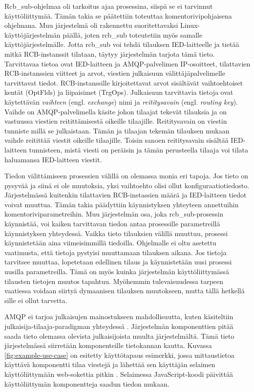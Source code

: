 Rcb\_sub-ohjelmaa oli tarkoitus ajaa prosessina, siispä se ei tarvinnut käyttöliittymää. Tämän takia se päätettiin toteuttaa komentorivipohjaisena ohjelmana. Muu järjestelmä oli rakennettu suoritettavaksi Linux-käyttöjärjestelmän päällä, joten rcb\_sub toteutetiin myös samalle käyttöjärjestelmälle. Jotta rcb\_sub voi tehdä tilauksen IED-laitteelle ja tietää mitkä RCB-instanssit tilataan, täytyy järjestelmän tarjota tämä tieto. Tarvittavaa tietoa ovat IED-laitteen ja AMQP-palvelimen IP-osoitteet, tilattavien RCB-instanssien viitteet ja arvot, viestien julkaisuun välittäjäpalvelimelle tarvittavat tiedot. RCB-instanssille kirjoitettavat arvot sisältävät vaihtoehtoiset kentät (OptFlds) ja liipaisimet (TrgOps). Julkaisuun tarvittavia tietoja ovat käytettävän \emph{vaihteen} (engl. \emph{exchange}) nimi ja \emph{reititysavain} (engl. \emph{routing key}). Vaihde on AMQP-palvelimella käsite johon tilaajat tekevät tilauksia ja on vastuussa viestien reitittämisestä oikeille tilaajille. Reititysavain on viestin tunniste millä se julkaistaan. Tämän ja tilaajan tekemän tilauksen mukaan vaihde reitittää viestit oikeille tilaajille. Toisin sanoen reititysavain sisältää IED-laitteen tunnisteen, mistä viesti on peräisin ja tämän perusteella tilaaja voi tilata haluamansa IED-laitteen viestit.

Tiedon välittämiseen prosessien välillä on olemassa monia eri tapoja. Jos tieto on pysyvää ja siinä ei ole muutoksia, yksi vaihtoehto olisi ollut konfiguraatiotiedosto. Järjestelmässä kuitenkin tilattavien RCB-instassien määrä ja IED-laitteen tiedot voivat muuttua. Tämän takia päädyttiin käynnistyksen yhteyteen annettuihin komentoriviparametreihin. Muu järjestelmän osa, joka rcb\_sub-prosessin käynnistää, voi kaiken tarvittavan tiedon antaa prosessille parametreillä käynnistyksen yhteydessä. Vaikka tieto tilauksien välillä muuttuu, prosessi käynnistetään aina viimeisimmillä tiedoilla. Ohjelmalle ei oltu asetettu vaatimusta, että tietoja pystyisi muuttamaan tilauksen aikana. Jos tietoja tarvitsee muuttaa, lopetetaan edellinen tilaus ja käynnistetään uusi prosessi uusilla parametreilla. Tämä on myös kuinka järjestelmän käyttöliittymässä tilausten tietojen muutos tapahtuu. Myöhemmin tulevaisuudessa tarpeen vaatiessa voidaan siirtyä dymaanisen tilauksen muutokseen, mutta tällä hetkellä sille ei ollut tarvetta.

AMQP ei tarjoa julkaisujen mainostukseen mahdollisuutta, kuten käsiteltiin julkaisija-tilaaja-paradigman yhteydessä \cite{AMQP-specification}. Järjestelmän komponenttien pitää saada tieto olemassa olevista julkaisijoista muulta järjestelmältä. Tämä tieto järjestelmässä siirretään komponenteille tietokannan kautta. Kuvassa \ref{fig:example-use-case} on esitetty käyttötapaus esimerkki, jossa mittaustietoa käyttävä komponentti tilaa viestejä ja lähettää sen käyttäjän selaimen käyttöliittymään web-sokettia pitkin \cite{websocket}. Selaimessa JavaScript-koodi päivittää käyttöliittymän komponentteja saadun tiedon mukaan.

